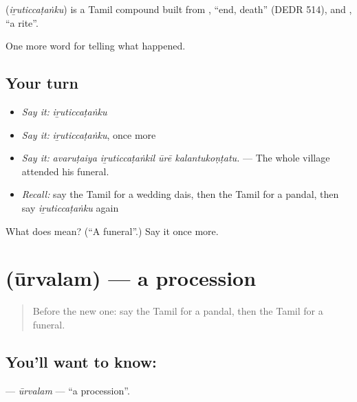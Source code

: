 \begin{cousinweb}
\textbf{} (\emph{iṟuticcaṭaṅku}) is a Tamil compound built from , \textquotedblleft{}end, death\textquotedblright{} (DEDR 514), and , \textquotedblleft{}a rite\textquotedblright{}.
\end{cousinweb}

\begin{grammarlens}[title={What you've built}]
One more word for telling what happened.
\end{grammarlens}

\subsection*{Your turn}
\begin{itemize}
\raggedright
  \item \emph{Say it:} \emph{iṟuticcaṭaṅku}
  \item \emph{Say it:} \emph{iṟuticcaṭaṅku}, once more
  \item \emph{Say it:} \emph{avaruṭaiya iṟuticcaṭaṅkil ūrē kalantukoṇṭatu.} — The whole village attended his funeral.
  \item \emph{Recall:} say the Tamil for a wedding dais, then the Tamil for a pandal, then say \emph{iṟuticcaṭaṅku} again
\end{itemize}

\begin{tcolorbox}[breakable,colback=teal!4,colframe=teal!35!black,title={Before you move on}]
What does  mean? (\textquotedblleft{}A funeral\textquotedblright{}.) Say it once more.
\end{tcolorbox}
\section[\texorpdfstring{\ta{ஊர்வலம்} (ūrvalam)}{ஊர்வலம் (ūrvalam)}]{ (ūrvalam) — a procession}

\label{lesson:TA-C323-urvalam}



\begin{quote}
Before the new one: say the Tamil for a pandal, then the Tamil for a funeral.
\end{quote}

\subsection*{You'll want to know: }
\textbf{} — \emph{ūrvalam} — \textquotedblleft{}a procession\textquotedblright{}.

